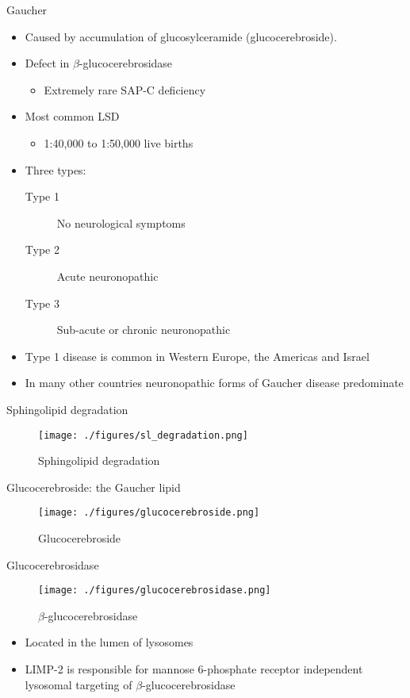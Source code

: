 \documentclass[presentation, smaller]{beamer}
\begin{document}
\begin{frame}[label={sec:orgheadline1}]{Gaucher}
\begin{itemize}
\item Caused by accumulation of glucosylceramide (glucocerebroside).
\item Defect in \(\beta\)-glucocerebrosidase
\begin{itemize}
\item Extremely rare SAP-C deficiency
\end{itemize}
\item Most common LSD
\begin{itemize}
\item 1:40,000 to 1:50,000 live births
\end{itemize}
\item Three types:
\begin{description}
\item[{Type 1}] No neurological symptoms
\item[{Type 2}] Acute neuronopathic
\item[{Type 3}] Sub-acute or chronic neuronopathic
\end{description}
\item Type 1 disease is common in Western Europe, the Americas and Israel
\item In many other countries neuronopathic forms of Gaucher disease predominate
\end{itemize}
\end{frame}

\begin{frame}[label={sec:orgheadline2}]{Sphingolipid degradation}
\begin{figure}[htb]
\centering
\texttt{[image: ./figures/sl\_degradation.png]}
\caption[deg]{\label{fig:sld}
Sphingolipid degradation}
\end{figure}
\end{frame}

\begin{frame}[label={sec:orgheadline3}]{Glucocerebroside: the Gaucher lipid}
\begin{figure}[htb]
\centering
\texttt{[image: ./figures/glucocerebroside.png]}
\caption[gluc]{\label{fig:gluc}
Glucocerebroside}
\end{figure}
\end{frame}

\begin{frame}[label={sec:orgheadline4}]{Glucocerebrosidase}
\begin{figure}[htb]
\centering
\texttt{[image: ./figures/glucocerebrosidase.png]}
\caption[block]{\label{fig:sidase}
\(\beta\)-glucocerebrosidase}
\end{figure}

\begin{itemize}
\item Located in the lumen of lysosomes
\item LIMP-2 is responsible for mannose 6-phosphate receptor independent
lysosomal targeting of \(\beta\)-glucocerebrosidase
\end{itemize}
\end{frame}
\end{document}
